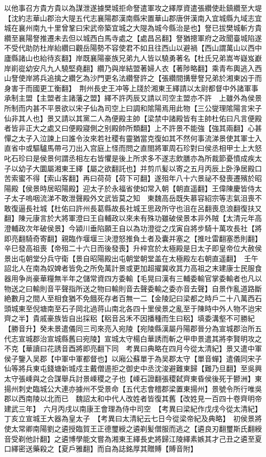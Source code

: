 以他事召方貴方貴以為謀泄遂據樊城拒命詧遣軍攻之繹厚資遣張纘使赴鎮纘至大堤【沈約志華山郡治大隄五代志襄陽郡漢南縣宋置華山郡唐併漢南入宜城縣九域志宜城在襄州南九十里曾鞏曰宋武帝築宜城之大隄為城今縣治是也】詧已拔樊城斬方貴纘至襄陽詧推遷未去但以城西白馬寺處之【處昌呂翻】詧猶摠軍府之政聞臺城陷遂不受代助防杜岸紿纘曰觀岳陽勢不容使君不如且往西山以避禍【西山謂萬山以西中廬縣諸山也紿待亥翻】岸既襄陽豪族兄弟九人皆以驍勇著名【杜氏兄弟嵩岑嶷岌巚岸崱嵸幼安凡九人驍堅堯翻】纘乃與岸結盟著婦人衣【著陟略翻】乘青布輿逃入西山詧使岸將兵追擒之纘乞為沙門更名法纘詧許之【張纘間搆譽詧兄弟於湘東凶于而身害于而國更工衡翻】　荆州長史王冲等上牋於湘東王繹請以太尉都督中外諸軍事承制主盟【主盟者主諸藩之盟】繹不許丙辰又請以司空主盟亦不許　上雖外為侯景所制而内甚不平景欲以宋子仙為司空上曰調和隂陽焉用此物【三公燮理隂陽言宋子仙非其人也】景又請以其黨二人為便殿主帥【梁禁中諸殿皆有主帥杜佑曰凡言便殿者皆非正大之處又曰便殿寢側之别殿帥所類翻】上不許景不能強【強其兩翻】心甚憚之太子入泣諫上曰誰令汝來若社稷有靈猶當克復如其不然何事流涕景使其軍士入直省中或驅驢馬帶弓刀出入宫庭上怪而問之直閤將軍周石珍對曰侯丞相甲士上大怒叱石珍曰是侯景何謂丞相左右皆懼是後上所求多不遂志飲膳亦為所裁節憂憤成疾太子以幼子大圜屬湘東王繹【屬之欲翻託也】并剪爪髪以寄之五月丙辰上卧浄居殿口苦索蜜不得【索山客翻】再曰荷荷【荷下可翻】遂殂年八十六景祕不發喪遷殯於昭陽殿【侯景時居昭陽殿】迎太子於永福省使如常入朝【朝直遥翻】王偉陳慶皆侍太子太子嗚咽流涕不敢泄聲殿外文武皆莫之知　東魏高岳既失慕容紹宗等志氣沮喪不敢復逼長社城【杜佑曰許州長葛縣故長社城王思政所守也沮在呂翻喪息浪翻復扶又翻】陳元康言於大將軍澄曰王自輔政以來未有殊功雖破侯景本非外賊【太清元年高澄輔政次年破侯景】今潁川垂陷願王自以為功澄從之戊寅自將步騎十萬攻長社【將即亮翻騎奇寄翻】親臨作堰堰三決澄怒推負土者及囊并塞之【推吐雷翻塞悉則翻】　辛巳發高祖喪【帝殂二十六日而後發喪】升梓宫於太極殿是日太子即皇帝位大赦侯景出屯朝堂分兵守衛【景自昭陽殿出屯朝堂朝堂盖在太極殿左右朝直遥翻】　壬午詔北人在南為奴婢者皆免之所免萬計景或更加超擢冀收其力高祖之末建康士民服食器用争尚豪華糧無半年之儲常資四方委輸【毛晃曰漢有三輔委輸官掌委輸者也凡以物送之曰輸則音平聲指所送之物曰輸則音去聲委輸之委亦音去聲】自景作亂道路斷絶數月之間人至相食猶不免餓死存者百無一二【金陵記曰梁都之時戶二十八萬西石頭城東至倪塘南至石子岡北過蒋山南北各四十里侯景之亂至于陳時中外人物不迨宋齊之半】貴戚豪族皆自出採稆【稆音呂禾不因播種而生曰稆】填委溝壑不可勝紀【勝音升】癸未景遣儀同三司來亮入宛陵【宛陵縣漢屬丹陽郡晉分為宣城郡治所五代志宣城郡治宣城縣舊曰宛陵】宣城太守楊白華誘而斬之甲申景遣其將李賢明攻之不克【華讀曰花誘音酉將即亮翻下同　考異曰典略在四月今從太清紀】景又遣中軍侯子鑒入吴郡【中軍中軍都督也】以廂公蘇單于為吴郡太守【單音蟬】遣儀同宋子仙等將兵東屯錢塘新城戍主戴僧逷拒之御史中丞沈浚避難東歸【難乃旦翻】至吳興太守張嵊與之合謀舉兵討景嵊稷之子也【嵊石證翻張稷弑齊東昏侯後死于鬰洲】東揚州刺史臨城公大連亦據州不受景命【五代志會稽郡梁置東揚州】景號令所行唯吳郡以西南陵以北而已　魏詔太和中代人改姓者皆復其舊【改姓見一百四十卷齊明帝建武三年】　六月丙戌以南康王會理為侍中司空　【考異曰梁紀作戊戌今從太清紀】　丁亥立宣城王大器為皇太子　【考異曰太清紀云七日今從梁帝紀及典略】　初侯景將使太常卿南陽劉之遴授臨賀王正德璽綬之遴剃髪僧服而逃之【遴良刃翻璽斯氏翻綬音受剃他計翻】之遴博學能文嘗為湘東王繹長史將歸江陵繹素嫉其才己丑之遴至夏口繹密送藥殺之【夏戶雅翻】而自為誌銘厚其贈賻【賻音附】